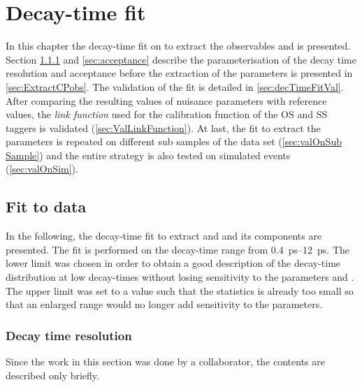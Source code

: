 \chapter{Decay-time fit}
\label{chap:dectimeFit}

\linespread{1.08}\selectfont
In this chapter the decay-time fit on \BdToDpi to extract the \CP observables \Sf and \Sfbar is presented.
Section \ref{sec:resolution} and \ref{sec:acceptance} describe the parameterisation of the decay time resolution and acceptance before the extraction of the \CP parameters is presented in \cref{sec:ExtractCPobs}.
The validation of the fit is detailed in \cref{sec:decTimeFitVal}.
After comparing the resulting values of nuisance parameters with reference values, the \emph{link function} used for the calibration function of the OS and SS taggers is validated (\cref{sec:ValLinkFunction}).
At last, the fit to extract the \CP parameters is repeated on different sub samples of the data set (\cref{sec:valOnSub Sample}) and the entire strategy is also tested on simulated events (\cref{sec:valOnSim}).

\section{Fit to data}

In the following, the decay-time fit to extract \Sf and \Sfbar and its components are presented.
The fit is performed on the decay-time range from \SIrange{0.4}{12}{\pico\second}.
The lower limit was chosen in order to obtain a good description of the decay-time distribution at low decay-times without losing sensitivity to the parameters \Sf and \Sfbar.
The upper limit was set to a value such that the statistics is already too small so that an enlarged range would no longer add sensitivity to the \CP parameters.

\subsection{Decay time resolution}
\label{sec:resolution}

Since the work in this section was done by a collaborator, the contents are described only briefly.

